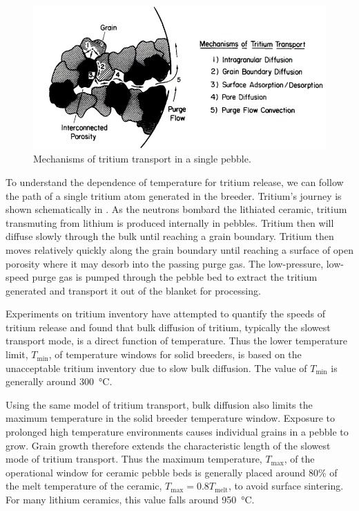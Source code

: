 \begin{figure}[ht]
    \centering
    \includegraphics[width=\singleimagewidth]{figures/mechanisms_tritium_transport} 
    \caption{Mechanisms of tritium transport in a single pebble\cite{Federici1990}.}
    \label{fig:mechanisms_tritium_transport}
\end{figure}

To understand the dependence of temperature for tritium release, we can follow the path of a single tritium atom generated in the breeder. Tritium's journey is shown schematically in . As the neutrons bombard the lithiated ceramic, tritium transmuting from lithium is produced internally in pebbles. Tritium then will diffuse slowly through the bulk until reaching a grain boundary. Tritium then moves relatively quickly along the grain boundary until reaching a surface of open porosity where it may desorb into the passing purge gas.\cite{Federici1990} The low-pressure, low-speed purge gas is pumped through the pebble bed to extract the tritium generated and transport it out of the blanket for processing.

Experiments on tritium inventory have attempted to quantify the speeds of tritium release and found that bulk diffusion of tritium, typically the slowest transport mode, is a direct function of temperature.\cite{Franza2013} Thus the lower temperature limit, $T_\text{min}$, of temperature windows for solid breeders, is based on the unacceptable tritium inventory due to slow bulk diffusion. The value of $T_\text{min}$ is generally around \SI{300}{\celsius}.

Using the same model of tritium transport, bulk diffusion also limits the maximum temperature in the solid breeder temperature window. Exposure to prolonged high temperature environments causes individual grains in a pebble to grow. Grain growth therefore extends the characteristic length of the slowest mode of tritium transport. Thus the maximum temperature, $T_\text{max}$, of the operational window for ceramic pebble beds is generally placed around 80\% of the melt temperature of the ceramic, $T_\text{max} = 0.8 T_\text{melt}$, to avoid surface sintering. For many lithium ceramics, this value falls around \SI{950}{\celsius}.

